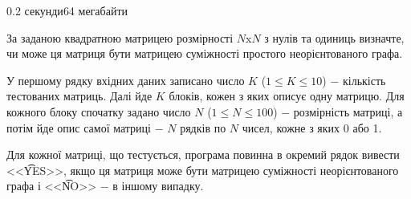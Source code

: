 \begin{problem}{}{}{}{0.2 секунди}{64 мегабайти}

За заданою квадратною матрицею розмірності $N$x$N$ з нулів та одиниць визначте,  
чи може ця матриця бути матрицею суміжності простого неорієнтованого графа.

\InputFile
У першому рядку вхідних даних записано число $K$ ($1 \le K \le 10$) $-$ кількість тестованих матриць. Далі йде $K$
блоків, кожен з яких описує одну матрицю. Для кожного блоку спочатку задано число $N$ ($1 \le N \le 100$) $-$ 
розмірність матриці, а потім йде опис самої матриці $-$ $N$ рядків по $N$ чисел, кожне з яких 0 або 1.

\OutputFile
Для кожної матриці, що тестується, програма повинна в окремий рядок вивести <<{\t{YES}}>>, якщо ця матриця 
може бути матрицею суміжності неорієнтованого графа і <<{\t{NO}}>> $-$ в іншому випадку.

\Example

\begin{example}
%
\end{example}

\end{problem}
